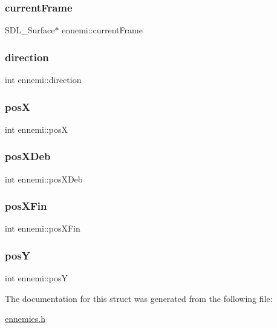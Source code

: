 \subsubsection{\texorpdfstring{current\+Frame}{currentFrame}}
{\footnotesize\ttfamily S\+D\+L\+\_\+\+Surface$\ast$ ennemi\+::current\+Frame}

\mbox{\label{structennemi_aa1f57a616910ffd5799f1097a3160e0b}} 
\subsubsection{\texorpdfstring{direction}{direction}}
{\footnotesize\ttfamily int ennemi\+::direction}

\mbox{\label{structennemi_aa20d1f2c58368aa075a35cf5f2cad931}} 
\subsubsection{\texorpdfstring{posX}{posX}}
{\footnotesize\ttfamily int ennemi\+::posX}

\mbox{\label{structennemi_afd42e01f19c7fcec3cb21dca8b4cf346}} 
\subsubsection{\texorpdfstring{pos\+X\+Deb}{posXDeb}}
{\footnotesize\ttfamily int ennemi\+::pos\+X\+Deb}

\mbox{\label{structennemi_a6da098ed49233503a361e3dbe184e3f4}} 
\subsubsection{\texorpdfstring{pos\+X\+Fin}{posXFin}}
{\footnotesize\ttfamily int ennemi\+::pos\+X\+Fin}

\mbox{\label{structennemi_a4b6aa99c085e81e3dec2df8d985f957a}} 
\subsubsection{\texorpdfstring{posY}{posY}}
{\footnotesize\ttfamily int ennemi\+::posY}



The documentation for this struct was generated from the following file\+:\begin{DoxyCompactItemize}
\item 
\hyperlink{ennemies_8h}{ennemies.\+h}\end{DoxyCompactItemize}
